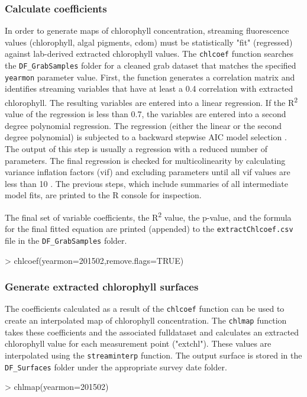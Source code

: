 \documentclass[12pt]{article}
\begin{document}
\subsubsection{Calculate coefficients}

In order to generate maps of chlorophyll concentration, streaming fluorescence values (chlorophyll, algal pigments, cdom) must be statistically "fit" (regressed) against lab-derived extracted chlorophyll values. The \texttt{chlcoef} function searches the \verb|DF_GrabSamples| folder for a cleaned grab dataset that matches the specified \texttt{yearmon} parameter value. First, the function generates a correlation matrix and identifies streaming variables that have at least a 0.4 correlation with extracted chlorophyll. The resulting variables are entered into a linear regression. If the R\textsuperscript{2} value of the regression is less than 0.7, the variables are entered into a second degree polynomial regression. The regression (either the linear or the second degree polynomial) is subjected to a backward stepwise AIC model selection \citep{mass}. The output of this step is usually a regression with a reduced number of parameters. The final regression is checked for multicolinearity by calculating variance inflation factors (vif) and excluding parameters until all vif values are less than 10 \citep{hh2002}. The previous steps, which include summaries of all intermediate model fits, are printed to the R console for inspection. 

The final set of variable coefficients, the R\textsuperscript{2} value, the p-value, and the formula for the final fitted equation are printed (appended) to the \texttt{extractChlcoef.csv} file in the \verb|DF_GrabSamples| folder.

\begin{Schunk}
\begin{Sinput}
> chlcoef(yearmon=201502,remove.flags=TRUE)
\end{Sinput}
\end{Schunk}

\subsubsection{Generate extracted chlorophyll surfaces}

The coefficients calculated as a result of the \texttt{chlcoef} function can be used to create an interpolated map of chlorophyll concentration. The \texttt{chlmap} function takes these coefficients and the associated fulldataset and calculates an extracted chlorophyll value for each measurement point ("extchl"). These values are interpolated using the \texttt{streaminterp} function. The output surface is stored in the \verb|DF_Surfaces| folder under the appropriate survey date folder.  

\begin{Schunk}
\begin{Sinput}
> chlmap(yearmon=201502)
\end{Sinput}
\end{Schunk}


\medskip

 
\end{document}
